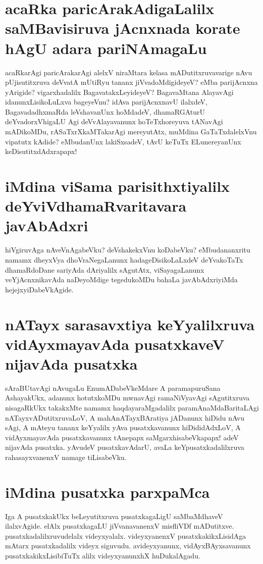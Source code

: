 \section*{acaRka paricArakAdigaLalilx saMBavisiruva jAcnxnada korate hAgU adara pariNAmagaLu}

acaRkarAgi paricArakarAgi alelxV niraMtara kelasa mADutitxruvavarige nAvu pUjisutitxruva deVvatA mUtiRyu tananx jiVvadoMdigideyeV? eMba parijAcnxna yArigide? vigarxhadalilx BagavatakxLeyideyeV? BagavaMtana AlayavAgi idanunxLisikoLuLxva bageyeVnu? idAva parijAcnxnavU ilalxdeV, BagavadadhxmaRda leVshavanUnx hoMdadeV, dhamaRGAturU deYvadorxVhigaLU Agi deVvAlayavanunx hoTeTxhoreyuva tANavAgi mADikoMDu, rASaTxrXkaMTakarAgi mereyutAtx, muMdina GaTaTxdalelxVnu vipatutx kAdide? eMbudanUnx lakiSxsadeV, tAvU keTuTx ELunereyanUnx keDisutitxdAdxrapapx!

\section*{iMdina viSama parisithxtiyalilx deYviVdhamaRvaritavara javAbAdxri}

hiVgiruvAga nAveVnAgabeVku? deVshakekxVnu koDabeVku? eMbudananxritu namamx dheyxVya dhoVraNegaLanunx hadageDisikoLaLxdeV deYvakoTaTx dhamaRdoDane sariyAda dAriyalilx sAgutAtx, viSayagaLanunx veYjAcnxnikavAda naDeyoMdige tegedukoMDu bahaLa javAbAdxriyiMda hejejxyiDabeVkAgide.

\section*{nATayx sarasavxtiya keYyalilxruva vidAyxmayavAda pusatxkaveV nijavAda pusatxka} 

sAraBUtavAgi nAvugaLu EnumADabeVkeMdare A paramapuruSana AshayakUkx, adanunx hotutxkoMDu mwnavAgi ramaNiVyavAgi sAgutitxruva nisagaRkUkx takakxMte namamx haqdayaraMgadalilx paramAnaMdaBaritaLAgi nATayxvADutitxruvaLoV, A mahAnATayxBAratiya jADanunx hiDidu nAvu sAgi, A mAteyu tananx keYyalilx yAva pusatxkavanunx hiDididAdxLoV, A vidAyxmayavAda pusatxkavanunx tAnepapx saMgarxhisabeVkapapx! adeV nijavAda pusatxka. yAvudeV pusatxkavAdarU, avaLa keYpusatxkadalilxruva rahasayxvanenxV namage tiLisabeVku.

\section*{iMdina pusatxka parxpaMca}

Iga A pusatxkakUkx beLeyutitxruva pusatxkagaLigU saMbaMdhaveV ilalxvAgide. elAlx pusatxkagaLU jiVvanavanenxV misfliVDf mADutitxve. pusatxkadalilxruvudelalx videyxyalalx. videyxyanenxV pusatxkakikxLisidAga mAtarx pusatxkadalilx videyx siguvudu. avideyxyanunx, vidAyxBAyxsavanunx pusatxkakikxLisibiTuTx alilx videyxyanunxhX huDukalAgadu.

